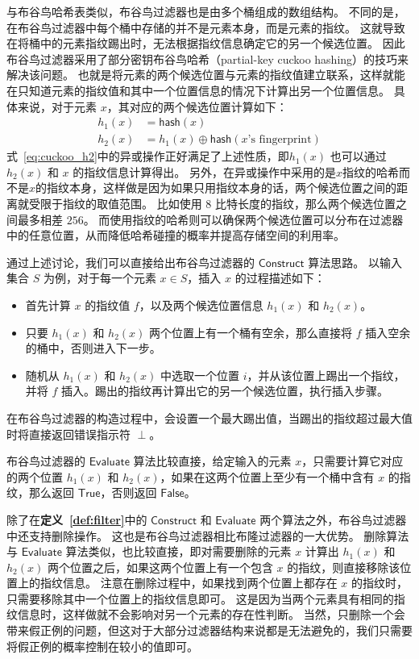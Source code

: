 与布谷鸟哈希表类似，布谷鸟过滤器也是由多个桶组成的数组结构。
不同的是，在布谷鸟过滤器中每个桶中存储的并不是元素本身，而是元素的指纹。
这就导致在将桶中的元素指纹踢出时，无法根据指纹信息确定它的另一个候选位置。
因此布谷鸟过滤器采用了部分密钥布谷鸟哈希（partial-key cuckoo hashing）的技巧来解决该问题。
也就是将元素的两个候选位置与元素的指纹值建立联系，这样就能在只知道元素的指纹值和其中一个位置信息的情况下计算出另一个位置信息。
具体来说，对于元素 $x$，其对应的两个候选位置计算如下：
\begin{align}
  h_1(x) & = \mathsf{hash}(x) \\
  h_2(x) & = h_1(x) \oplus \mathsf{hash}(x\mbox{'s fingerprint}) \label{eq:cuckoo_h2}
\end{align}
式~\ref{eq:cuckoo_h2}中的异或操作正好满足了上述性质，即$h_1(x)$ 也可以通过 $h_2(x)$ 和 $x$ 的指纹信息计算得出。
另外，在异或操作中采用的是$x$指纹的哈希而不是$x$的指纹本身，这样做是因为如果只用指纹本身的话，两个候选位置之间的距离就受限于指纹的取值范围。
比如使用 $8$ 比特长度的指纹，那么两个候选位置之间最多相差 $256$。
而使用指纹的哈希则可以确保两个候选位置可以分布在过滤器中的任意位置，从而降低哈希碰撞的概率并提高存储空间的利用率。

通过上述讨论，我们可以直接给出布谷鸟过滤器的 $\mathsf{Construct}$ 算法思路。
以输入集合 $S$ 为例，对于每一个元素 $x\in S$，插入 $x$ 的过程描述如下：
\begin{itemize}
  \item 首先计算 $x$ 的指纹值 $f$，以及两个候选位置信息 $h_1(x)$ 和 $h_2(x)$。
  \item 只要 $h_1(x)$ 和 $h_2(x)$ 两个位置上有一个桶有空余，那么直接将 $f$ 插入空余的桶中，否则进入下一步。
  \item 随机从 $h_1(x)$ 和 $h_2(x)$ 中选取一个位置 $i$，并从该位置上踢出一个指纹，并将 $f$ 插入。踢出的指纹再计算出它的另一个候选位置，执行插入步骤。
\end{itemize}
在布谷鸟过滤器的构造过程中，会设置一个最大踢出值，当踢出的指纹超过最大值时将直接返回错误指示符 $\perp$。

布谷鸟过滤器的 $\mathsf{Evaluate}$ 算法比较直接，给定输入的元素 $x$，只需要计算它对应的两个位置 $h_1(x)$ 和 $h_2(x)$，如果在这两个位置上至少有一个桶中含有 $x$ 的指纹，那么返回 $\mathsf{True}$，否则返回 $\mathsf{False}$。

除了在\textbf{定义~\ref{def:filter}}中的 $\mathsf{Construct}$ 和 $\mathsf{Evaluate}$ 两个算法之外，布谷鸟过滤器中还支持删除操作。
这也是布谷鸟过滤器相比布隆过滤器的一大优势。
删除算法与 $\mathsf{Evaluate}$ 算法类似，也比较直接，即对需要删除的元素 $x$ 计算出 $h_1(x)$ 和 $h_2(x)$ 两个位置之后，如果这两个位置上有一个包含 $x$ 的指纹，则直接移除该位置上的指纹信息。
注意在删除过程中，如果找到两个位置上都存在 $x$ 的指纹时，只需要移除其中一个位置上的指纹信息即可。
这是因为当两个元素具有相同的指纹信息时，这样做就不会影响对另一个元素的存在性判断。
当然，只删除一个会带来假正例的问题，但这对于大部分过滤器结构来说都是无法避免的，我们只需要将假正例的概率控制在较小的值即可。

